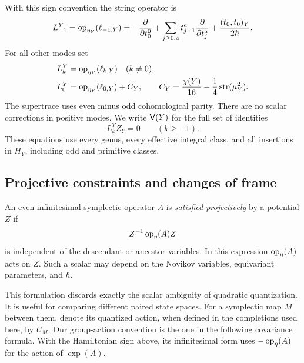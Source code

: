 With this sign convention the string operator is
\begin{equation}
 L_{-1}^Y=\operatorname{op}_{\eta_Y}(\ell_{-1,Y})
   =-\frac{\partial}{\partial t_0^0}
     +\sum_{j\geq0,a}t_{j+1}^a\frac{\partial}{\partial t_j^a}
     +\frac{(t_0,t_0)_Y}{2\hbar}.
 \label{conv:string}
\end{equation}
For all other modes set
\begin{equation}
\begin{split}
 L_k^Y&=\operatorname{op}_{\eta_Y}(\ell_{k,Y})\quad(k\ne0),\\
 L_0^Y&=\operatorname{op}_{\eta_Y}(\ell_{0,Y})+C_Y,
 \qquad
 C_Y=\frac{\chi(Y)}{16}-\frac14\operatorname{str}(\mu_Y^2).
\end{split}
\label{conv:normalized-modes}
\end{equation}
The supertrace uses even minus odd cohomological parity.  There are no
scalar corrections in positive modes.  We write $\mathsf V(Y)$ for the full set
of identities
\begin{equation}
                    L_k^Y Z_Y=0\qquad(k\geq-1).
                    \label{conv:virasoro}
\end{equation}
These equations use every genus, every effective integral class, and all
insertions in $H_Y$, including odd and primitive classes.

\subsection{Projective constraints and changes of frame}

\begin{definition}\label{conv:projective}
An even infinitesimal symplectic operator $A$ is \emph{satisfied
projectively} by a potential $Z$ if
\[
                       Z^{-1}\operatorname{op}_\eta(A)Z
\]
is independent of the descendant or ancestor variables.  In this
expression $\operatorname{op}_\eta(A)$ acts on $Z$.  Such a scalar may depend on the
Novikov variables, equivariant parameters, and $\hbar$.
\end{definition}

This formulation discards exactly the scalar ambiguity of quadratic
quantization.  It is useful for comparing different paired state spaces.
For a symplectic map $M$ between them, denote its quantized action, when
defined in the completions used here, by $U_M$.  Our group-action
convention is the one in the following covariance formula.  With the
Hamiltonian sign above, its infinitesimal form uses $-\operatorname{op}_\eta(A)$ for
the action of $\exp(A)$.

